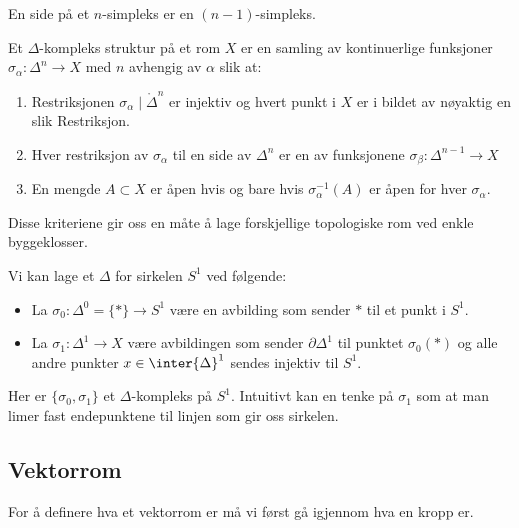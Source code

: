 En side på et $n$-simpleks er en $(n-1)$-simpleks.
\begin{definition}\label{Def:Deltastrkt}
    Et $\Delta$-kompleks struktur på et rom $X$ er en samling av kontinuerlige funksjoner $\sigma_\alpha: \Delta^n\to X$ med $n$ avhengig av $\alpha$ slik at:
    \begin{enumerate}
        \item Restriksjonen $\sigma_\alpha\mid\mathring{\Delta}^n$ er injektiv og hvert punkt i $X$ er i bildet av nøyaktig en slik Restriksjon.
        \item Hver restriksjon av $\sigma_\alpha$ til en side av $\Delta^n$ er en av funksjonene $\sigma_\beta: \Delta^{n-1}\to X$
        \item En mengde $A\subset X$ er åpen hvis og bare hvis $\sigma_\alpha^{-1}(A)$ er åpen for hver $\sigma_\alpha$.
    \end{enumerate}
\end{definition}
Disse kriteriene gir oss en måte å lage forskjellige topologiske rom ved enkle byggeklosser.

\begin{example}[ex:SirkelDkomp]
    Vi kan lage et $\Delta$ for sirkelen $S^1$ ved følgende:
    \begin{itemize}
        \item La $\sigma_0:\Delta^0=\{\ast\}\to S^1$ være en avbilding som sender $\ast$ til et punkt i $S^1$.
        \item La $\sigma_1: \Delta^1\to X$ være avbildingen som sender $\partial \Delta^1$ til punktet $\sigma_0(\ast)$ og alle andre punkter $x\in\inter{\Delta}^1$ sendes injektiv til $S^1$.
    \end{itemize}
    Her er $\{\sigma_0,\sigma_1\}$ et $\Delta$-kompleks på $S^1$. Intuitivt kan en tenke på $\sigma_1$ som at man limer fast endepunktene til linjen som gir oss sirkelen.
\end{example}

\subsection{Vektorrom}\label{Sec:Vekt}
For å definere hva et vektorrom er må vi først gå igjennom hva en kropp er.

